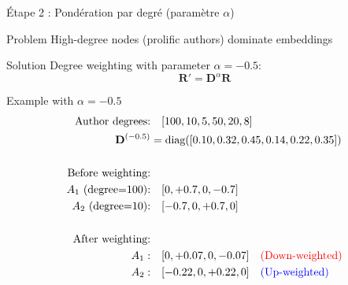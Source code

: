 \documentclass[9pt,aspectratio=169,professionalfonts]{beamer}
\begin{document}
\begin{frame}{Étape 2 : Pondération par degré (paramètre \(\alpha\))}
\begin{alertblock}{Problem}
High-degree nodes (prolific authors) dominate embeddings
\end{alertblock}

\begin{block}{Solution}
Degree weighting with parameter $\alpha = -0.5$:
$$\boxed{\mathbf{R}' = \mathbf{D}^{\alpha} \mathbf{R}}$$
\end{block}

\begin{exampleblock}{Example with $\alpha = -0.5$}
\begin{align*}
\text{Author degrees:} &\quad [100, 10, 5, 50, 20, 8] \\
\mathbf{D}^{(-0.5)} &= \text{diag}([0.10, 0.32, 0.45, 0.14, 0.22, 0.35]) \\
\\
\text{Before weighting:} \\
A_1 \text{ (degree=100):} &\quad [0, +0.7, 0, -0.7] \\
A_2 \text{ (degree=10):} &\quad [-0.7, 0, +0.7, 0] \\
\\
\text{After weighting:} \\
A_1: &\quad [0, +0.07, 0, -0.07] \quad \text{\color{red} (Down-weighted)} \\
A_2: &\quad [-0.22, 0, +0.22, 0] \quad \text{\color{blue} (Up-weighted)}
\end{align*}
\end{exampleblock}
\end{frame}
\end{document}
